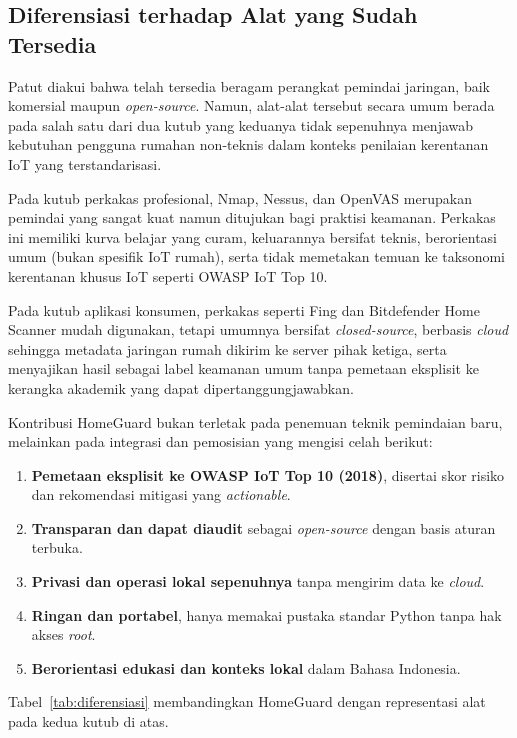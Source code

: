 \documentclass[conference]{IEEEtran}
\begin{document}
\subsection{Diferensiasi terhadap Alat yang Sudah Tersedia}

Patut diakui bahwa telah tersedia beragam perangkat pemindai jaringan, baik komersial maupun \textit{open-source}. Namun, alat-alat tersebut secara umum berada pada salah satu dari dua kutub yang keduanya tidak sepenuhnya menjawab kebutuhan pengguna rumahan non-teknis dalam konteks penilaian kerentanan IoT yang terstandarisasi.

Pada kutub perkakas profesional, Nmap, Nessus, dan OpenVAS merupakan pemindai yang sangat kuat namun ditujukan bagi praktisi keamanan. Perkakas ini memiliki kurva belajar yang curam, keluarannya bersifat teknis, berorientasi umum (bukan spesifik IoT rumah), serta tidak memetakan temuan ke taksonomi kerentanan khusus IoT seperti OWASP IoT Top 10.

Pada kutub aplikasi konsumen, perkakas seperti Fing dan Bitdefender Home Scanner mudah digunakan, tetapi umumnya bersifat \textit{closed-source}, berbasis \textit{cloud} sehingga metadata jaringan rumah dikirim ke server pihak ketiga, serta menyajikan hasil sebagai label keamanan umum tanpa pemetaan eksplisit ke kerangka akademik yang dapat dipertanggungjawabkan.

Kontribusi HomeGuard bukan terletak pada penemuan teknik pemindaian baru, melainkan pada integrasi dan pemosisian yang mengisi celah berikut:

\begin{enumerate}
    \item \textbf{Pemetaan eksplisit ke OWASP IoT Top 10 (2018)}, disertai skor risiko dan rekomendasi mitigasi yang \textit{actionable}.
    \item \textbf{Transparan dan dapat diaudit} sebagai \textit{open-source} dengan basis aturan terbuka.
    \item \textbf{Privasi dan operasi lokal sepenuhnya} tanpa mengirim data ke \textit{cloud}.
    \item \textbf{Ringan dan portabel}, hanya memakai pustaka standar Python tanpa hak akses \textit{root}.
    \item \textbf{Berorientasi edukasi dan konteks lokal} dalam Bahasa Indonesia.
\end{enumerate}

Tabel\ \ref{tab:diferensiasi} membandingkan HomeGuard dengan representasi alat pada kedua kutub di atas.
\end{document}
